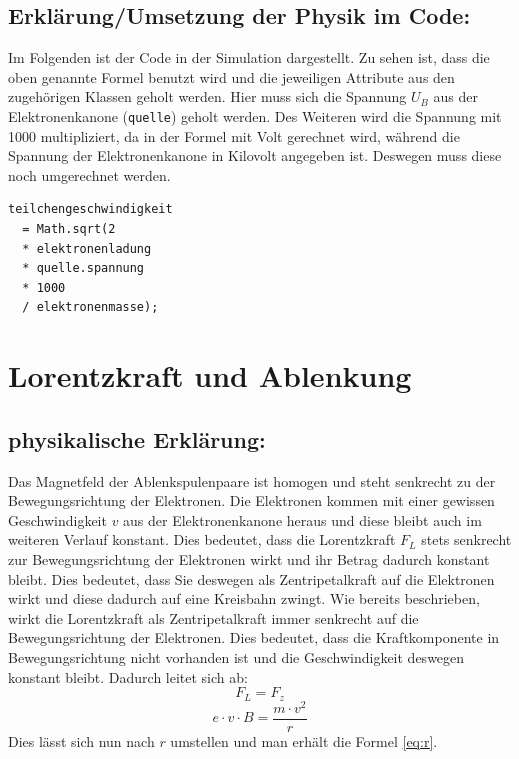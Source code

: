\subsection{Erklärung/Umsetzung der Physik im Code:}

Im Folgenden ist der Code in der Simulation dargestellt.
Zu sehen ist, dass die oben genannte Formel benutzt wird und die jeweiligen Attribute aus den zugehörigen Klassen geholt werden.
Hier muss sich die Spannung $U_B$ aus der Elektronenkanone (\lstinline$quelle$)  geholt werden.
Des Weiteren wird die Spannung mit 1000 multipliziert, da in der Formel mit Volt gerechnet wird, während die Spannung der Elektronenkanone in Kilovolt angegeben ist. Deswegen muss diese noch umgerechnet werden.

\begin{lstlisting}
teilchengeschwindigkeit 
  = Math.sqrt(2 
  * elektronenladung 
  * quelle.spannung 
  * 1000 
  / elektronenmasse);
\end{lstlisting}

\section{Lorentzkraft und Ablenkung}

\subsection{physikalische Erklärung:}

Das Magnetfeld der Ablenkspulenpaare ist homogen und steht senkrecht zu der Bewegungsrichtung der Elektronen.
Die Elektronen kommen mit einer gewissen Geschwindigkeit $v$ aus der Elektronenkanone heraus und diese bleibt auch im weiteren Verlauf konstant.
Dies bedeutet, dass die Lorentzkraft $F_L$ stets senkrecht zur Bewegungsrichtung der Elektronen wirkt und ihr Betrag dadurch konstant bleibt.
Dies bedeutet, dass Sie deswegen als Zentripetalkraft auf die Elektronen wirkt und diese dadurch auf eine Kreisbahn zwingt.
Wie bereits beschrieben, wirkt die Lorentzkraft als Zentripetalkraft immer senkrecht auf die Bewegungsrichtung der Elektronen.
Dies bedeutet, dass die Kraftkomponente in Bewegungsrichtung nicht vorhanden ist und die Geschwindigkeit deswegen konstant bleibt.
Dadurch leitet sich ab: 
$$ F_L=F_z$$
$$ e \cdot v \cdot B = \frac{m \cdot v^2}{r}$$
Dies lässt sich nun nach $r$ umstellen und man erhält die Formel \ref{eq:r}.   


